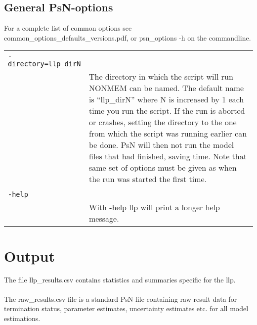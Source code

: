 \documentclass[a4paper,12pt]{article}
\begin{document}
\subsection{General PsN-options}

For a complete list of common options see common\_options\_defaults\_versions.pdf, or psn\_options -h on the commandline.

\begin{longtable}{p{1in}p{4in}}
\verb|-directory=llp_dirN| & \\
\nopagebreak
 & The directory in which the script will run NONMEM can be named. The default name is “llp\_dirN” where N is increased by 1 each time you run the script. If the run is aborted or crashes, setting the directory to the one from which the script was running earlier can be done. PsN will then not run the model files that had finished, saving time. Note that same set of options must be given as when the run was started the first time. \\
\\
\verb|-help| & \\
 & With -help llp will print a longer help message. \\
\end{longtable}


\section{Output}

The file llp\_results.csv contains statistics and summaries specific for the llp. \\
\\
The raw\_results.csv file is a standard PsN file containing raw result data for termination status, parameter estimates, uncertainty estimates etc. for all model estimations. 
\end{document}
